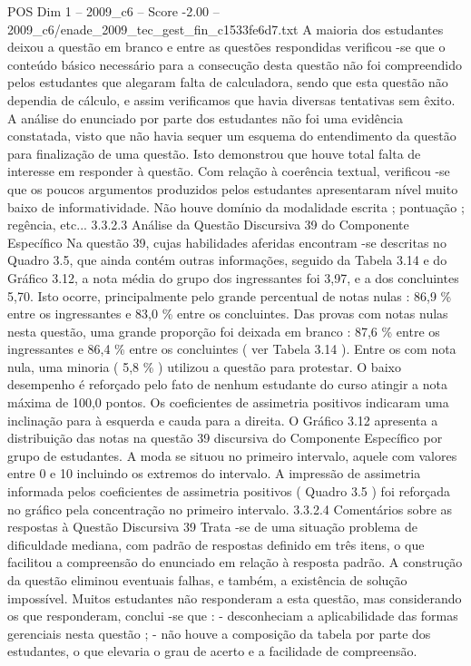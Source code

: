 \begin{textsample}{POS Dim 1 – 2009\_c6 – Score -2.00 – 2009\_c6/enade\_2009\_tec\_gest\_fin\_c1533fe6d7.txt}
A maioria dos estudantes deixou a questão em branco e entre as questões respondidas verificou -se que o conteúdo básico necessário para a consecução desta questão não foi compreendido pelos estudantes que alegaram falta de calculadora, sendo que esta questão não dependia de cálculo, e assim verificamos que havia diversas tentativas sem êxito.
A análise do enunciado por parte dos estudantes não foi uma evidência constatada, visto que não havia sequer um esquema do entendimento da questão para finalização de uma questão.
Isto demonstrou que houve total falta de interesse em responder à questão.
Com relação à coerência textual, verificou -se que os poucos argumentos produzidos pelos estudantes apresentaram nível muito baixo de informatividade.
Não houve domínio da modalidade escrita ; pontuação ; regência, etc... 3.3.2.3 Análise da Questão Discursiva 39 do Componente Específico Na questão 39, cujas habilidades aferidas encontram -se descritas no Quadro 3.5, que ainda contém outras informações, seguido da Tabela 3.14 e do Gráfico 3.12, a nota média do grupo dos ingressantes foi 3,97, e a dos concluintes 5,70.
Isto ocorre, principalmente pelo grande percentual de notas nulas : 86,9 \% entre os ingressantes e 83,0 \% entre os concluintes.
Das provas com notas nulas nesta questão, uma grande proporção foi deixada em branco : 87,6 \% entre os ingressantes e 86,4 \% entre os concluintes ( ver Tabela 3.14 ).
Entre os com nota nula, uma minoria ( 5,8 \% ) utilizou a questão para protestar.
O baixo desempenho é reforçado pelo fato de nenhum estudante do curso atingir a nota máxima de 100,0 pontos.
Os coeficientes de assimetria positivos indicaram uma inclinação para à esquerda e cauda para a direita.
O Gráfico 3.12 apresenta a distribuição das notas na questão 39 discursiva do Componente Específico por grupo de estudantes.
A moda se situou no primeiro intervalo, aquele com valores entre 0 e 10 incluindo os extremos do intervalo.
A impressão de assimetria informada pelos coeficientes de assimetria positivos ( Quadro 3.5 ) foi reforçada no gráfico pela concentração no primeiro intervalo. 3.3.2.4 Comentários sobre as respostas à Questão Discursiva 39 Trata -se de uma situação problema de dificuldade mediana, com padrão de respostas definido em três itens, o que facilitou a compreensão do enunciado em relação à resposta padrão.
A construção da questão eliminou eventuais falhas, e também, a existência de solução impossível.
Muitos estudantes não responderam a esta questão, mas considerando os que responderam, conclui -se que : - desconheciam a aplicabilidade das formas gerenciais nesta questão ; - não houve a composição da tabela por parte dos estudantes, o que elevaria o grau de acerto e a facilidade de compreensão.

\end{textsample}
